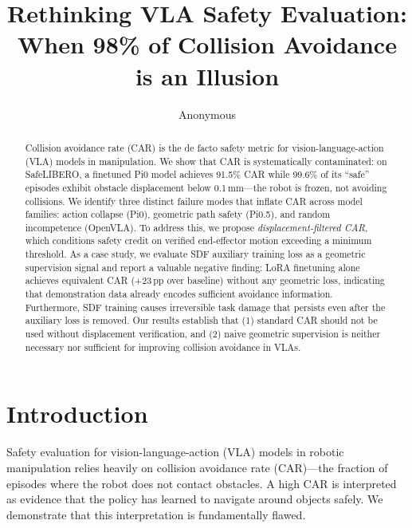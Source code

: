\documentclass[letterpaper]{article}
\title{Rethinking VLA Safety Evaluation:\\When 98\% of Collision Avoidance is an Illusion}
\author{Anonymous}
\begin{document}
\maketitle

\begin{abstract}
Collision avoidance rate (CAR) is the de facto safety metric for vision-language-action (VLA) models in manipulation. We show that CAR is systematically contaminated: on SafeLIBERO, a finetuned Pi0 model achieves 91.5\% CAR while 99.6\% of its ``safe'' episodes exhibit obstacle displacement below 0.1\,mm---the robot is frozen, not avoiding collisions. We identify three distinct failure modes that inflate CAR across model families: action collapse (Pi0), geometric path safety (Pi0.5), and random incompetence (OpenVLA). To address this, we propose \emph{displacement-filtered CAR}, which conditions safety credit on verified end-effector motion exceeding a minimum threshold. As a case study, we evaluate SDF auxiliary training loss as a geometric supervision signal and report a valuable negative finding: LoRA finetuning alone achieves equivalent CAR (+23\,pp over baseline) without any geometric loss, indicating that demonstration data already encodes sufficient avoidance information. Furthermore, SDF training causes irreversible task damage that persists even after the auxiliary loss is removed. Our results establish that (1) standard CAR should not be used without displacement verification, and (2) naive geometric supervision is neither necessary nor sufficient for improving collision avoidance in VLAs.
\end{abstract}

\section{Introduction}
\label{sec:intro}

Safety evaluation for vision-language-action (VLA) models in robotic manipulation relies heavily on collision avoidance rate (CAR)---the fraction of episodes where the robot does not contact obstacles. A high CAR is interpreted as evidence that the policy has learned to navigate around objects safely. We demonstrate that this interpretation is fundamentally flawed.
\end{document}

